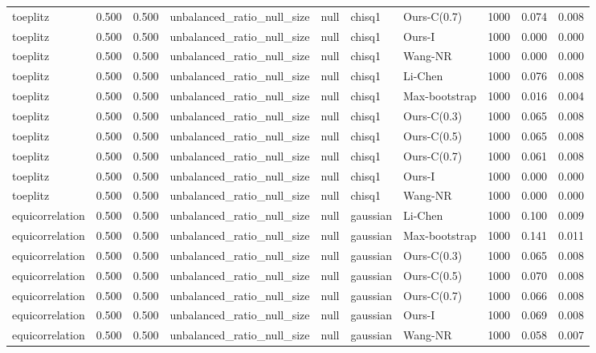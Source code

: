 \begin{tabular}{lrrllllrrr}
toeplitz & 0.500 & 0.500 & unbalanced\_ratio\_null\_size & null & chisq1 & Ours-C(0.7) & 1000 & 0.074 & 0.008 \\
toeplitz & 0.500 & 0.500 & unbalanced\_ratio\_null\_size & null & chisq1 & Ours-I & 1000 & 0.000 & 0.000 \\
toeplitz & 0.500 & 0.500 & unbalanced\_ratio\_null\_size & null & chisq1 & Wang-NR & 1000 & 0.000 & 0.000 \\
toeplitz & 0.500 & 0.500 & unbalanced\_ratio\_null\_size & null & chisq1 & Li-Chen & 1000 & 0.076 & 0.008 \\
toeplitz & 0.500 & 0.500 & unbalanced\_ratio\_null\_size & null & chisq1 & Max-bootstrap & 1000 & 0.016 & 0.004 \\
toeplitz & 0.500 & 0.500 & unbalanced\_ratio\_null\_size & null & chisq1 & Ours-C(0.3) & 1000 & 0.065 & 0.008 \\
toeplitz & 0.500 & 0.500 & unbalanced\_ratio\_null\_size & null & chisq1 & Ours-C(0.5) & 1000 & 0.065 & 0.008 \\
toeplitz & 0.500 & 0.500 & unbalanced\_ratio\_null\_size & null & chisq1 & Ours-C(0.7) & 1000 & 0.061 & 0.008 \\
toeplitz & 0.500 & 0.500 & unbalanced\_ratio\_null\_size & null & chisq1 & Ours-I & 1000 & 0.000 & 0.000 \\
toeplitz & 0.500 & 0.500 & unbalanced\_ratio\_null\_size & null & chisq1 & Wang-NR & 1000 & 0.000 & 0.000 \\
equicorrelation & 0.500 & 0.500 & unbalanced\_ratio\_null\_size & null & gaussian & Li-Chen & 1000 & 0.100 & 0.009 \\
equicorrelation & 0.500 & 0.500 & unbalanced\_ratio\_null\_size & null & gaussian & Max-bootstrap & 1000 & 0.141 & 0.011 \\
equicorrelation & 0.500 & 0.500 & unbalanced\_ratio\_null\_size & null & gaussian & Ours-C(0.3) & 1000 & 0.065 & 0.008 \\
equicorrelation & 0.500 & 0.500 & unbalanced\_ratio\_null\_size & null & gaussian & Ours-C(0.5) & 1000 & 0.070 & 0.008 \\
equicorrelation & 0.500 & 0.500 & unbalanced\_ratio\_null\_size & null & gaussian & Ours-C(0.7) & 1000 & 0.066 & 0.008 \\
equicorrelation & 0.500 & 0.500 & unbalanced\_ratio\_null\_size & null & gaussian & Ours-I & 1000 & 0.069 & 0.008 \\
equicorrelation & 0.500 & 0.500 & unbalanced\_ratio\_null\_size & null & gaussian & Wang-NR & 1000 & 0.058 & 0.007 \\

\end{tabular}
